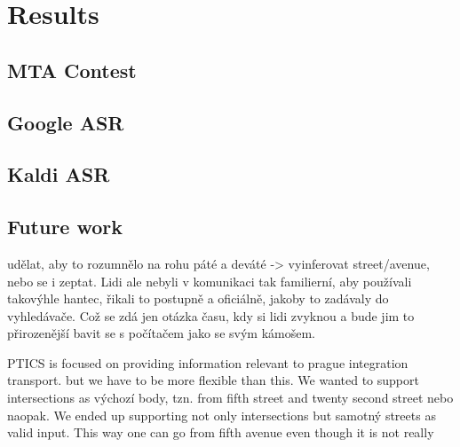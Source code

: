 \chapter{Results}


\section{MTA Contest}

\section{Google ASR}
\section{Kaldi ASR}

\section{Future work}


udělat, aby to rozumnělo na rohu páté a deváté -> vyinferovat street/avenue, nebo se i zeptat. Lidi ale nebyli v komunikaci tak familierní, aby používali takovýhle hantec, řikali to postupně a oficiálně, jakoby to zadávaly do vyhledávače. Což se zdá jen otázka času, kdy si lidi zvyknou a bude jim to přirozenější bavit se s počítačem jako se svým kámošem.


PTICS is focused on providing information relevant to prague integration transport. but we have to be more flexible than this. We wanted to support intersections as výchozí body, tzn. from fifth street and twenty second street nebo naopak. We ended up supporting not only intersections but samotný streets as valid input. This way one can go from fifth avenue even though it is not really 



